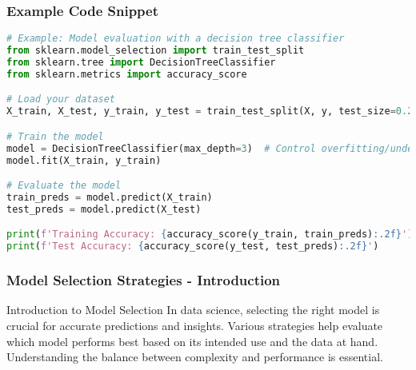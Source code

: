 \documentclass[aspectratio=169]{beamer}
\begin{document}
\begin{frame}[fragile]
    \frametitle{Example Code Snippet}

    \begin{lstlisting}[language=Python]
# Example: Model evaluation with a decision tree classifier
from sklearn.model_selection import train_test_split
from sklearn.tree import DecisionTreeClassifier
from sklearn.metrics import accuracy_score

# Load your dataset
X_train, X_test, y_train, y_test = train_test_split(X, y, test_size=0.2, random_state=42)

# Train the model
model = DecisionTreeClassifier(max_depth=3)  # Control overfitting/underfitting
model.fit(X_train, y_train)

# Evaluate the model
train_preds = model.predict(X_train)
test_preds = model.predict(X_test)

print(f'Training Accuracy: {accuracy_score(y_train, train_preds):.2f}')
print(f'Test Accuracy: {accuracy_score(y_test, test_preds):.2f}')
    \end{lstlisting}
\end{frame}

\begin{frame}[fragile]
    \frametitle{Model Selection Strategies - Introduction}
    \begin{block}{Introduction to Model Selection}
        In data science, selecting the right model is crucial for accurate predictions and insights. Various strategies help evaluate which model performs best based on its intended use and the data at hand. Understanding the balance between complexity and performance is essential.
    \end{block}
\end{frame}
\end{document}
